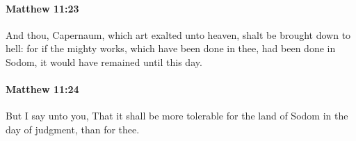 		\paragraph{Matthew 11:23} %
			\label{MATTHEW-11-23}

			And thou, Capernaum, which art exalted unto heaven, shalt be brought down to hell: for if the mighty works, which have been done in thee, had been done in Sodom, it would have remained until this day.

			\begin{framed}
			\scriptsize
				\begin{compactdesc}
					\item[SBLG] 
				\end{compactdesc}
			\end{framed}

		\paragraph{Matthew 11:24} %
			\label{MATTHEW-11-24}

			But I say unto you, That it shall be more tolerable for the land of Sodom in the day of judgment, than for thee.


